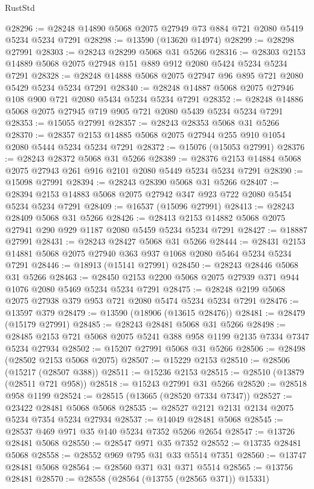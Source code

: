 \begin{lexlean}{RustStd}
\begin{coremodule}
@28296 := @28248 @14890 @5068 @2075 @27949 @73 @884 @721 @2080 @5419 @5234 @5234 @7291
@28298 := @13590 (@13620 @14974)
@28299 := @28298 @27991
@28303 := @28243 @28299 @5068 @31 @5266
@28316 := @28303 @2153 @14889 @5068 @2075 @27948 @151 @889 @912 @2080 @5424 @5234 @5234 @7291
@28328 := @28248 @14888 @5068 @2075 @27947 @96 @895 @721 @2080 @5429 @5234 @5234 @7291
@28340 := @28248 @14887 @5068 @2075 @27946 @108 @900 @721 @2080 @5434 @5234 @5234 @7291
@28352 := @28248 @14886 @5068 @2075 @27945 @719 @905 @721 @2080 @5439 @5234 @5234 @7291
@28353 := @15055 @27991
@28357 := @28243 @28353 @5068 @31 @5266
@28370 := @28357 @2153 @14885 @5068 @2075 @27944 @255 @910 @1054 @2080 @5444 @5234 @5234 @7291
@28372 := @15076 (@15053 @27991)
@28376 := @28243 @28372 @5068 @31 @5266
@28389 := @28376 @2153 @14884 @5068 @2075 @27943 @261 @916 @2101 @2080 @5449 @5234 @5234 @7291
@28390 := @15098 @27991
@28394 := @28243 @28390 @5068 @31 @5266
@28407 := @28394 @2153 @14883 @5068 @2075 @27942 @347 @923 @722 @2080 @5454 @5234 @5234 @7291
@28409 := @16537 (@15096 @27991)
@28413 := @28243 @28409 @5068 @31 @5266
@28426 := @28413 @2153 @14882 @5068 @2075 @27941 @290 @929 @1187 @2080 @5459 @5234 @5234 @7291
@28427 := @18887 @27991
@28431 := @28243 @28427 @5068 @31 @5266
@28444 := @28431 @2153 @14881 @5068 @2075 @27940 @363 @937 @1068 @2080 @5464 @5234 @5234 @7291
@28446 := @18913 (@15141 @27991)
@28450 := @28243 @28446 @5068 @31 @5266
@28463 := @28450 @2153 @2200 @5068 @2075 @27939 @371 @944 @1076 @2080 @5469 @5234 @5234 @7291
@28475 := @28248 @2199 @5068 @2075 @27938 @379 @953 @721 @2080 @5474 @5234 @5234 @7291
@28476 := @13597 @379
@28479 := @13590 (@18906 (@13615 @28476))
@28481 := @28479 (@15179 @27991)
@28485 := @28243 @28481 @5068 @31 @5266
@28498 := @28485 @2153 @721 @5068 @2075 @5241 @388 @958 @1199 @2135 @7334 @7347 @5234 @27934
@28502 := @15207 @27991 @5068 @31 @5266
@28506 := @28498 (@28502 @2153 @5068 @2075)
@28507 := @15229 @2153
@28510 := @28506 (@15217 (@28507 @388))
@28511 := @15236 @2153
@28515 := @28510 (@13879 (@28511 @721 @958))
@28518 := @15243 @27991 @31 @5266
@28520 := @28518 @958 @1199
@28524 := @28515 (@13665 (@28520 @7334 @7347))
@28527 := @23422 @28481 @5068 @5068
@28535 := @28527 @2121 @2131 @2134 @2075 @5234 @7354 @5234 @27934
@28537 := @14049 @28481 @5068
@28545 := @28537 @469 @971 @35 @140 @5234 @7352 @5266 @2654
@28547 := @13726 @28481 @5068
@28550 := @28547 @971 @35 @7352
@28552 := @13735 @28481 @5068
@28558 := @28552 @969 @795 @31 @33 @5514 @7351
@28560 := @13747 @28481 @5068
@28564 := @28560 @371 @31 @371 @5514
@28565 := @13756 @28481
@28570 := @28558 (@28564 (@13755 (@28565 @371)) @15331)

\end{coremodule}
\end{lexlean}

